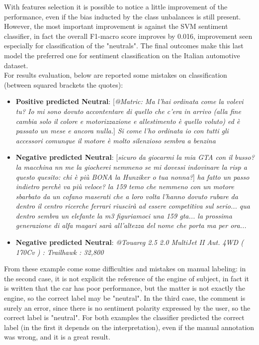 With features selection it is possible to notice a little improvement of the performance, even if the bias inducted by the class unbalances is still present. However, the most important improvement is against the SVM sentiment classifier, in fact the overall F1-macro score improves by 0.016, improvement seen especially for classification of the "neutrals". The final outcomes make this last model the preferred one for sentiment classification on the Italian automotive dataset.\\
For results evaluation, below are reported some mistakes on classification (between squared brackets the quotes):

\begin{itemize}
	\item \textbf{Positive predicted Neutral}: [\textit{@Matric: Ma l'hai ordinata come la volevi tu? Io mi sono dovuto accontentare di quello che c'era in arrivo (alla fine cambia solo il colore e motorizzazione e allestimento è quello voluto) ed è passato un mese e ancora nulla.}] \textit{Si come l'ho ordinata io con tutti gli accessori comunque il motore è molto silenzioso sembra a benzina}\\
	\item \textbf{Negative predicted Neutral}: [\textit{sicuro da giocarmi la mia GTA con il busso?la macchina nn me la giocherei nemmeno se mi dovessi indovinare la risp a questo quesito: chi è più BONA la Hunziker o tua nonna?}] \textit{ha fatto un passo indietro perchè va più veloce? la 159 temo che nemmeno con un motore sbarbato da un cofano maserati che a loro volta l'hanno dovuto rubare da dentro il centro ricerche ferrari riuscirà ad essere competitiva sul serio... qua dentro sembra un elefante la m3 figuriamoci una 159 gta... la prossima generazione di alfa magari sarà all'altezza del nome che porta ma per ora... }
	\item \textbf{Negative predicted Neutral}: \textit{@Touareg 2.5 2.0 MultiJet II Aut. 4WD ( 170Cv ) : Trailhawk : 32,800}
\end{itemize}

From these example come some difficulties and mistakes on manual labeling: in the second case, it is not explicit the reference of the engine of subject, in fact it is written that the car has poor performance, but the matter is not exactly the engine, so the correct label may be "neutral". In the third case, the comment is surely an error, since there is no sentiment polarity expressed by the user, so the correct label is "neutral". For both examples the classifier predicted the correct label (in the first it depends on the interpretation), even if the manual annotation was wrong, and it is a great result.



